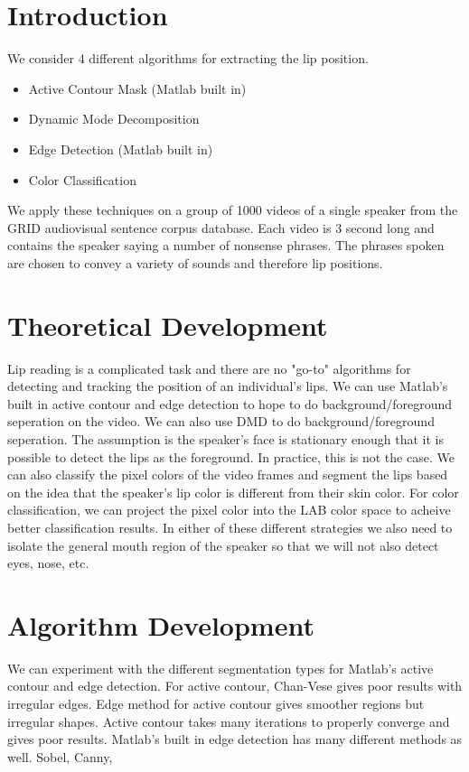 \documentclass{article}
\begin{document}
\section{Introduction}
We consider 4 different algorithms for extracting the lip position. \begin{itemize}
  \item Active Contour Mask (Matlab built in)
\item Dynamic Mode Decomposition 
\item Edge Detection (Matlab built in)
\item Color Classification
\end{itemize}
We apply these techniques on a group of 1000 videos of a single speaker from the GRID audiovisual sentence corpus database. Each video is 3 second long and contains the speaker saying a number of nonsense phrases. The phrases spoken are chosen to convey a variety of sounds and therefore lip positions.



\section{Theoretical Development}
Lip reading is a complicated task and there are no "go-to" algorithms for detecting and tracking the position of an individual's lips. We can use Matlab's built in active contour and edge detection to hope to do background/foreground seperation on the video. We can also use DMD to do background/foreground seperation. The assumption is the speaker's face is stationary enough that it is possible to detect the lips as the foreground. In practice, this is not the case. We can also classify the pixel colors of the video frames and segment the lips based on the idea that the speaker's lip color is different from their skin color. For color classification, we can project the pixel color into the LAB color space to acheive better classification results. In either of these different strategies we also need to isolate the general mouth region of the speaker so that we will not also detect eyes, nose, etc. 

\section{Algorithm Development}

We can experiment with the different segmentation types for Matlab's active contour and edge detection. For active contour, Chan-Vese gives poor results with irregular edges. Edge method for active contour gives smoother regions but irregular shapes. Active contour takes many iterations to properly converge and gives poor results. Matlab's built in edge detection has many different methods as well. Sobel, Canny,
\end{document}
